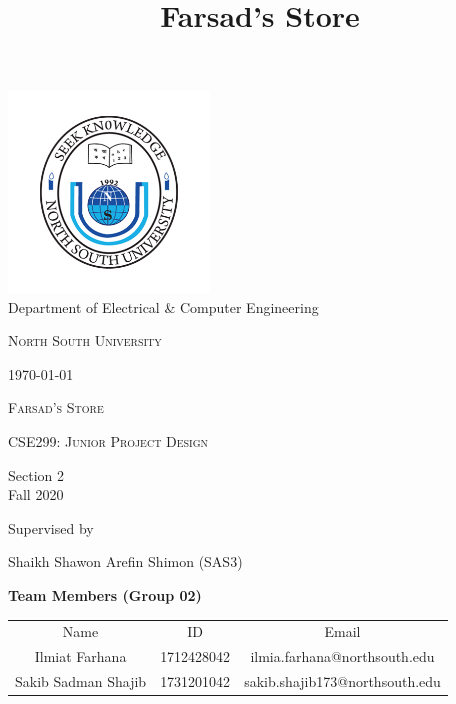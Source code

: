 \documentclass[12pt]{article}
\title{Farsad's Store}
\begin{document}
\begin{titlepage}
    \begin{center}
        \includegraphics[width=0.4\textwidth]{NSU.png} \\
        Department of Electrical \& Computer Engineering\\
        {\scshape\LARGE North South University \par}
        \today
        \vspace{1cm}
        
        {\scshape\Large Farsad's Store\par}
 
        \vspace{0.5cm}
        {\scshape\Large CSE299: Junior Project Design\par}
        Section 2 \\ Fall 2020
             
        \vspace{0.5cm}
        Supervised by\par
	    Shaikh Shawon Arefin Shimon (SAS3) \par
        \vspace{0.5cm}
        \textbf{Team Members (Group 02)} \par
        \begin{tabular}{c c c}
            Name & ID & Email \\
            Ilmiat Farhana & 1712428042 & ilmia.farhana@northsouth.edu \\
            Sakib Sadman Shajib & 1731201042 & sakib.shajib173@northsouth.edu \\
        \end{tabular}

        \vfill
             
    \end{center}
\end{titlepage}
\end{document}
